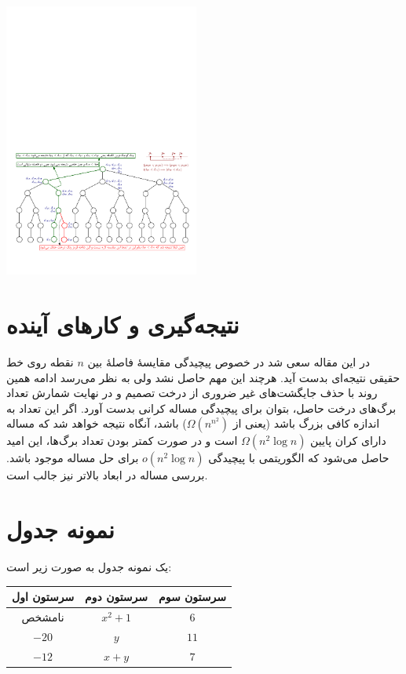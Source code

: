 \documentclass[a0,portrait]{a0poster}
\theoremstyle{definition}
\theoremstyle{plain}
\theoremstyle{definition}
\begin{document}
\begin{multicols}{2}
\begin{center}\vspace{1cm}
\includegraphics[width=0.48\textwidth]{prblmOnSort.pdf}
\label{fig-prlm-sort}
\end{center}
\section{نتیجه‌گیری و  کارهای آینده} \label{note-prblms}
 در این مقاله سعی شد در خصوص پیچیدگی مقایسۀ فاصلۀ بین $n$ نقطه روی خط حقیقی نتیجه‌ای بدست آید. هرچند این مهم حاصل نشد ولی به نظر می‌رسد ادامه همین روند با حذف جایگشت‌های غیر ضروری از درخت تصمیم و در نهایت شمارش تعداد برگ‌های درخت حاصل، بتوان برای پیچیدگی مساله کرانی بدست آورد. اگر این تعداد به اندازه کافی بزرگ باشد (یعنی از $\Omega(n^{n^2})$) باشد، آنگاه نتیجه خواهد شد که مساله دارای کران پایین $\Omega(n^2\log n)$ است و  در صورت کمتر بودن تعداد برگ‌ها، این امید حاصل می‌شود که الگوریتمی با پیچیدگی $o(n^2\log n)$ برای حل مساله موجود باشد.  بررسی مساله در ابعاد بالاتر
 نیز جالب است.
\section{نمونه جدول} \label{note-prblms}
یک نمونه جدول به صورت زیر است:
\begin{center}\vspace{1cm}
\centering
{}\label{vtab1}
\begin{tabular}{ccc}
\hline
سرستون اول & سرستون دوم & سرستون سوم \\ \hline
نامشخص & $x^2+1$ & $6$ \\ 
$-20$ & $y$ & $11$ \\
$-12$ & $x+y$ & $7$\\
 \hline
\end{tabular} 
\end{center}


\end{multicols}
\end{document}
